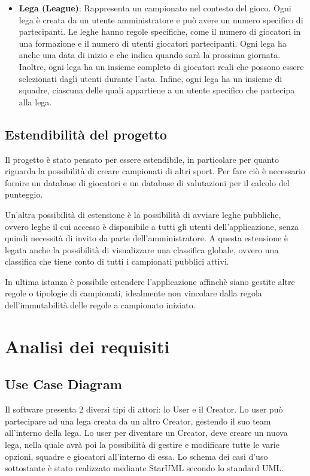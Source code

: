 \documentclass[twoside,openright,titlepage,fleqn,headinclude,12pt,a4paper,BCOR=5mm,footinclude]{scrbook}
\begin{document}
\begin{itemize}
     \item \textbf{Lega (League)}: Rappresenta un campionato nel contesto del gioco. Ogni lega è creata da un utente amministratore e può avere un numero specifico di partecipanti. Le leghe hanno regole specifiche, come il numero di giocatori in una formazione e il numero di utenti giocatori partecipanti. Ogni lega ha anche una data di inizio e che indica quando sarà la prossima giornata. Inoltre, ogni lega ha un insieme completo di giocatori reali che possono essere selezionati dagli utenti durante l'asta. Infine, ogni lega ha un insieme di squadre, ciascuna delle quali appartiene a un utente specifico che partecipa alla lega.
     
\end{itemize}

\section{Estendibilità del progetto}
Il progetto è stato pensato per essere estendibile, in particolare per quanto riguarda la possibilità di creare campionati di altri sport.
Per fare ciò è necessario fornire un database di giocatori e un database di valutazioni per il calcolo del punteggio.

Un'altra possibilità di estensione è la possibilità di avviare leghe pubbliche, ovvero leghe il cui accesso è disponibile a tutti gli utenti 
dell'applicazione, senza quindi necessità di invito da parte dell'amministratore. A questa estensione è legata anche la possibilità di visualizzare una
classifica globale, ovvero una classifica che tiene conto di tutti i campionati pubblici attivi.

In ultima istanza è possibile estendere l'applicazione affinchè siano gestite altre regole o tipologie di campionati, idealmente non vincolare dalla regola
dell'immutabilità delle regole a campionato iniziato. 

\chapter{Analisi dei requisiti}
\section{Use Case Diagram}
Il software presenta 2 diversi tipi di attori: lo User e il Creator. Lo user può partecipare ad una lega creata da un altro Creator, gestendo il suo team all'interno della lega. Lo user per diventare un Creator, deve creare un nuova lega, nella quale avrà poi la possibilità di gestire e modificare tutte le varie opzioni, squadre e giocatori all'interno di essa. Lo schema dei casi d'uso sottostante è stato realizzato mediante StarUML secondo lo standard UML.
\end{document}

